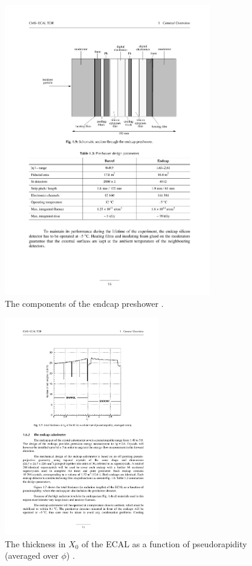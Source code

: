 \begin{figure}[h!]
\begin{center}
\includegraphics[width=0.8\textwidth]{figures/CMS/ECAL/ecalTDR/es-19.pdf}
\caption{The components of the endcap preshower \cite{ECAL_TDR}.}
\label{fig:CMS_Ecal_preshower}
\end{center}
\end{figure}


\begin{figure}[h!]
\begin{center}
\includegraphics[width=0.6\textwidth]{figures/CMS/ECAL/ecalTDR/material-budget-17.pdf}
\caption{The thickness in $X_{0}$ of the ECAL as a function of pseudorapidity (averaged over $\phi$) \cite{ECAL_TDR}.}
\label{fig:CMS_Ecal_3}
\end{center}
\end{figure}

